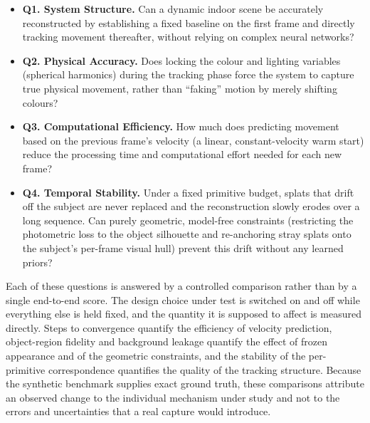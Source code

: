 \begin{itemize}
    \item \textbf{Q1. System Structure.} Can a dynamic indoor scene be
    accurately reconstructed by establishing a fixed baseline on the first frame
    and directly tracking movement thereafter, without relying on complex neural
    networks?

    \item \textbf{Q2. Physical Accuracy.} Does locking the colour and lighting
    variables (spherical harmonics) during the tracking phase force the system
    to capture true physical movement, rather than \enquote{faking} motion by
    merely shifting colours?

    \item \textbf{Q3. Computational Efficiency.} How much does predicting
    movement based on the previous frame's velocity (a linear, constant-velocity
    warm start) reduce the processing time and computational effort needed for
    each new frame?

    \item \textbf{Q4. Temporal Stability.} Under a fixed primitive budget,
    splats that drift off the subject are never replaced and the reconstruction
    slowly erodes over a long sequence. Can purely geometric, model-free
    constraints (restricting the photometric loss to the object silhouette and
    re-anchoring stray splats onto the subject's per-frame visual hull) prevent
    this drift without any learned priors?

\end{itemize}

Each of these questions is answered by a controlled comparison rather than by a
single end-to-end score. The design choice under test is switched on and off
while everything else is held fixed, and the quantity it is supposed to affect
is measured directly. Steps to convergence quantify the efficiency of velocity
prediction, object-region fidelity and background leakage quantify the effect of
frozen appearance and of the geometric constraints, and the stability of the
per-primitive correspondence quantifies the quality of the tracking structure.
Because the synthetic benchmark supplies exact ground truth, these comparisons
attribute an observed change to the individual mechanism under study and not to
the errors and uncertainties that a real capture would introduce.

